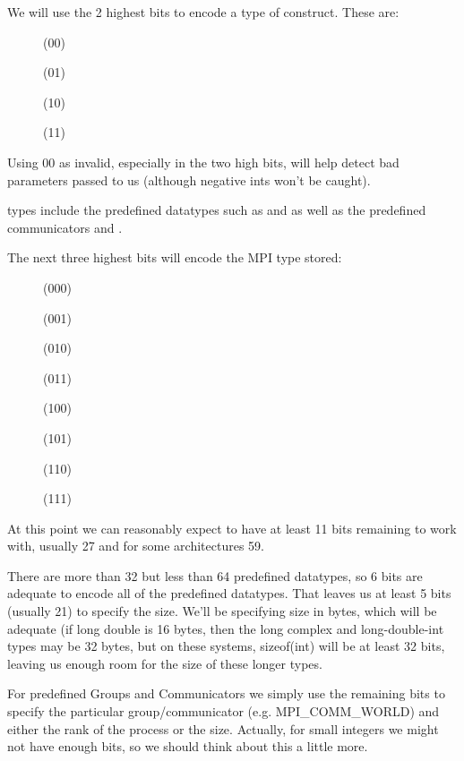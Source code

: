 \documentclass{article}
\begin{document}
We will use the 2 highest bits to encode a type of construct.  These are:
\begin{description}
\item[]  (00)
\item[]  (01)
\item[]   (10)
\item[] (11)
\end{description}

Using 00 as invalid, especially in the two high bits, will help detect
bad parameters passed to us (although negative ints won't be caught).

 types include the predefined datatypes such as
 and  as well as the predefined communicators
 and .

The next three highest bits will encode the MPI type stored:
\begin{description}
\item[]     (000)
\item[]    (001)
\item[] (010)
\item[]     (011)
\item[](100)
\item[]       (101)
\item[]     (110)
\item[]      (111)
\end{description}

At this point we can reasonably expect to have at least 11 bits remaining
to work with, usually 27 and for some architectures 59.

There are more than 32 but less than 64 predefined datatypes, so 6 bits are
adequate to encode all of the predefined datatypes.
That leaves us at least 5 bits
(usually 21) to specify the size.  We'll be specifying size in bytes,
which will be adequate (if long double is 16 bytes, then the long complex and
long-double-int types may be 32 bytes, but on these systems, sizeof(int) will
be at least 32 bits, leaving us enough room for the size of these longer
types. 

For predefined Groups and Communicators we simply use the remaining bits
to specify the particular group/communicator (e.g. MPI_COMM_WORLD) and 
either the rank of the process or the size.  Actually, for small integers we
might not have enough bits, so we should think about this a little more.
\end{document}
